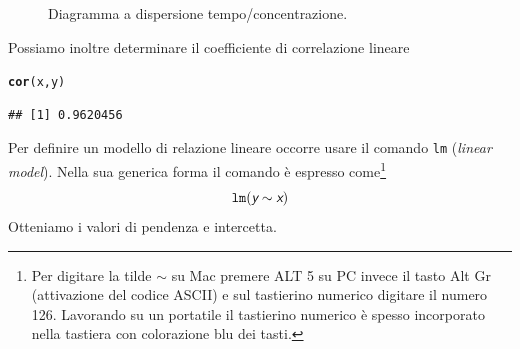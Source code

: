 \documentclass[onecolumn,12pt]{book}\usepackage[]{graphicx}\usepackage[]{color}
\makeatletter
\newcommand{\hlstd}[1]{\textcolor[rgb]{0.345,0.345,0.345}{#1}}%
\newcommand{\hlkwd}[1]{\textcolor[rgb]{0.737,0.353,0.396}{\textbf{#1}}}%
\newenvironment{kframe}{%
 \def\at@end@of@kframe{}%
 \ifinner\ifhmode%
  \def\at@end@of@kframe{\end{minipage}}%
  \begin{minipage}{\columnwidth}%
 \fi\fi%
 \def\FrameCommand##1{\hskip\@totalleftmargin \hskip-\fboxsep
 \colorbox{shadecolor}{##1}\hskip-\fboxsep
     \hskip-\linewidth \hskip-\@totalleftmargin \hskip\columnwidth}%
 \MakeFramed {\advance\hsize-\width
   \@totalleftmargin\z@ \linewidth\hsize
   \@setminipage}}%
 {\par\unskip\endMakeFramed%
 \at@end@of@kframe}
\newenvironment{knitrout}{}{} %
\newcommand{\varia}[1]{\textsl{\textsf{#1}}}
\newcommand{\mytilde}{$\sim$}
\makeatother
\begin{document}
\begin{figure}[htbp]
\begin{center}
\begin{knitrout}
{}



\end{knitrout}
\caption{Diagramma a dispersione tempo/concentrazione.}
\label{fig:scatte}
\end{center}
\end{figure}
Possiamo inoltre determinare il coefficiente di correlazione lineare
\begin{knitrout}
\color{fgcolor}\begin{kframe}
\begin{alltt}
\hlkwd{cor}\hlstd{(x,y)}
\end{alltt}
\begin{verbatim}
## [1] 0.9620456
\end{verbatim}
\end{kframe}
\end{knitrout}
Per definire un modello di relazione lineare occorre usare il comando \texttt{lm} (\varia{linear model}).
Nella sua generica forma il comando \`e espresso come\footnote{ Per digitare la tilde  \mytilde\;  su Mac premere ALT 5 su PC invece il tasto Alt Gr (attivazione del codice ASCII) e sul tastierino numerico digitare il numero 126. Lavorando su un portatile il tastierino numerico \`e spesso incorporato nella tastiera con colorazione blu dei tasti.}
$$\texttt{lm}(\varia{y} \sim  \varia{x})$$
Otteniamo i valori di pendenza e intercetta.
\end{document}
